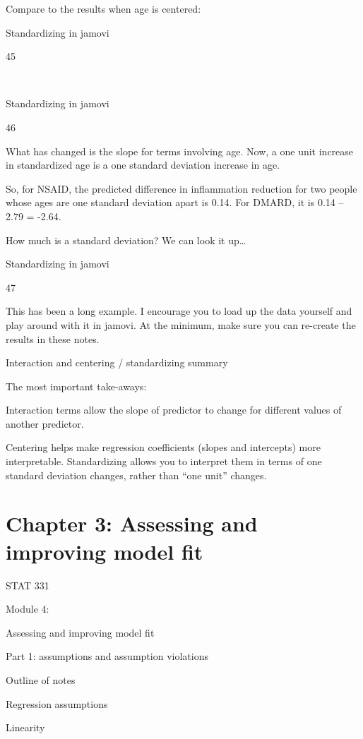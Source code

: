 \documentclass[
  letterpaper,
  DIV=11,
  numbers=noendperiod]{scrreprt}
\begin{document}
Compare to the results when age is centered:

Standardizing in jamovi

45

~

Standardizing in jamovi

46

What has changed is the slope for terms involving age. Now, a one unit
increase in standardized age is a one standard deviation increase in
age.

So, for NSAID, the predicted difference in inflammation reduction for
two people whose ages are one standard deviation apart is 0.14. For
DMARD, it is 0.14 -- 2.79 = -2.64.

How much is a standard deviation? We can look it up\ldots{}

Standardizing in jamovi

47

This has been a long example. I encourage you to load up the data
yourself and play around with it in jamovi. At the minimum, make sure
you can re-create the results in these notes.

Interaction and centering / standardizing summary

The most important take-aways:

Interaction terms allow the slope of predictor to change for different
values of another predictor. 

Centering helps make regression coefficients (slopes and intercepts)
more interpretable. Standardizing allows you to interpret them in terms
of one standard deviation changes, rather than ``one unit'' changes.


\hypertarget{chapter-3-assessing-and-improving-model-fit}{%
\chapter{Chapter 3: Assessing and improving model
fit}\label{chapter-3-assessing-and-improving-model-fit}}

STAT 331

Module 4:

Assessing and improving model fit

Part 1: assumptions and assumption violations

Outline of notes

Regression assumptions

Linearity
\end{document}
